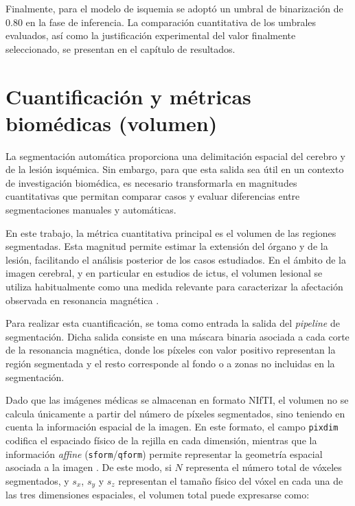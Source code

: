 Finalmente, para el modelo de isquemia se adoptó un umbral de binarización de \(0.80\) en la fase de inferencia. La comparación cuantitativa de los umbrales evaluados, así como la justificación experimental del valor finalmente seleccionado, se presentan en el capítulo de resultados.

\section{Cuantificación y métricas biomédicas (volumen)}

La segmentación automática proporciona una delimitación espacial del cerebro y de la lesión isquémica. Sin embargo, para que esta salida sea útil en un contexto de investigación biomédica, es necesario transformarla en magnitudes cuantitativas que permitan comparar casos y evaluar diferencias entre segmentaciones manuales y automáticas.

En este trabajo, la métrica cuantitativa principal es el volumen de las regiones segmentadas. Esta magnitud permite estimar la extensión del órgano y de la lesión, facilitando el análisis posterior de los casos estudiados. En el ámbito de la imagen cerebral, y en particular en estudios de ictus, el volumen lesional se utiliza habitualmente como una medida relevante para caracterizar la afectación observada en resonancia magnética \citep{Harston2015,Ospel2024}.

Para realizar esta cuantificación, se toma como entrada la salida del \textit{pipeline} de segmentación. Dicha salida consiste en una máscara binaria asociada a cada corte de la resonancia magnética, donde los píxeles con valor positivo representan la región segmentada y el resto corresponde al fondo o a zonas no incluidas en la segmentación.

Dado que las imágenes médicas se almacenan en formato NIfTI, el volumen no se calcula únicamente a partir del número de píxeles segmentados, sino teniendo en cuenta la información espacial de la imagen. En este formato, el campo \texttt{pixdim} codifica el espaciado físico de la rejilla en cada dimensión, mientras que la información \textit{affine} (\texttt{sform}/\texttt{qform}) permite representar la geometría espacial asociada a la imagen \citep{NIfTI1Fields,NiBabelNifti}. De este modo, si \(N\) representa el número total de vóxeles segmentados, y \(s_x\), \(s_y\) y \(s_z\) representan el tamaño físico del vóxel en cada una de las tres dimensiones espaciales, el volumen total puede expresarse como:

